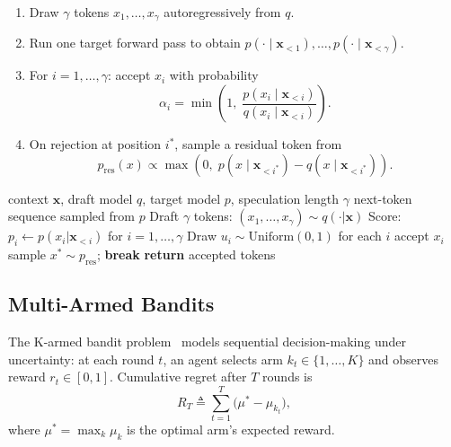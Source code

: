 \documentclass[11pt]{article}
\newcommand{\defeq}{\triangleq}
\begin{document}
\begin{enumerate}
  \item Draw $\gamma$ tokens $x_1, \ldots, x_\gamma$ autoregressively from $q$.
  \item Run one target forward pass to obtain
        $p(\cdot \mid \mathbf{x}_{<1}), \ldots, p(\cdot \mid \mathbf{x}_{<\gamma})$.
  \item For $i = 1, \ldots, \gamma$: accept $x_i$ with probability
        \begin{equation}
          \label{eq:accept}
          \alpha_i = \min\!\left(1,\;\frac{p(x_i \mid \mathbf{x}_{<i})}
                                          {q(x_i \mid \mathbf{x}_{<i})}\right).
        \end{equation}
  \item On rejection at position $i^*$, sample a residual token from
        \begin{equation}
          \label{eq:residual}
          p_{\text{res}}(x) \propto \max\!\left(0,\;
            p(x \mid \mathbf{x}_{<i^*}) - q(x \mid \mathbf{x}_{<i^*})\right).
        \end{equation}
\end{enumerate}

\begin{algorithm}[t]
\caption{Speculative Sampling (Leviathan et al., 2023)}
\label{alg:spec}
\begin{algorithmic}[1]
\REQUIRE context $\mathbf{x}$, draft model $q$, target model $p$,
         speculation length $\gamma$
\ENSURE next-token sequence sampled from $p$
\STATE Draft $\gamma$ tokens: $(x_1,\ldots,x_\gamma) \sim q(\cdot|\mathbf{x})$
\STATE Score: $p_i \leftarrow p(x_i|\mathbf{x}_{<i})$ for $i=1,\ldots,\gamma$
\STATE Draw $u_i \sim \mathrm{Uniform}(0,1)$ for each $i$
    \STATE accept $x_i$
  \ELSE
    \STATE sample $x^* \sim p_{\mathrm{res}}$; \textbf{break}
  \ENDIF
\ENDFOR
\STATE \textbf{return} accepted tokens
\end{algorithmic}
\end{algorithm}

\subsection{Multi-Armed Bandits}

The K-armed bandit problem~\citep{robbins1952} models sequential
decision-making under uncertainty: at each round $t$, an agent selects
arm $k_t \in \{1,\ldots,K\}$ and observes reward $r_t \in [0,1]$.
Cumulative regret after $T$ rounds is
\begin{equation}
  R_T \defeq \sum_{t=1}^{T} \bigl(\mu^* - \mu_{k_t}\bigr),
\end{equation}
where $\mu^* = \max_k \mu_k$ is the optimal arm's expected reward.
\end{document}

